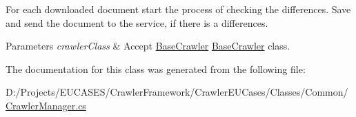 For each downloaded document start the process of checking the differences. Save and send the document to the service, if there is a differences. 


\begin{DoxyParams}{Parameters}
{\em crawler\-Class} & Accept \hyperlink{class_crawler_1_1_classes_1_1_common_1_1_base_crawler}{Base\-Crawler} \hyperlink{class_crawler_1_1_classes_1_1_common_1_1_base_crawler}{Base\-Crawler} class.\\
\hline
\end{DoxyParams}


The documentation for this class was generated from the following file\-:\begin{DoxyCompactItemize}
\item 
D\-:/\-Projects/\-E\-U\-C\-A\-S\-E\-S/\-Crawler\-Framework/\-Crawler\-E\-U\-Cases/\-Classes/\-Common/\hyperlink{_crawler_manager_8cs}{Crawler\-Manager.\-cs}\end{DoxyCompactItemize}

